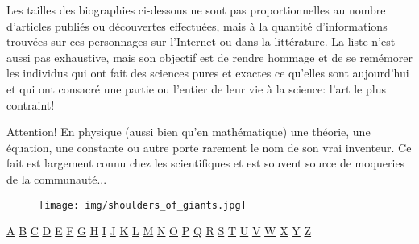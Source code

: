 Les tailles des biographies ci-dessous ne sont pas proportionnelles au nombre d'articles publiés ou découvertes effectuées, mais à la quantité d'informations trouvées sur ces personnages sur l'Internet ou dans la littérature. La liste n'est aussi pas exhaustive, mais son objectif est de rendre hommage et de se remémorer les individus qui ont fait des sciences pures et exactes ce qu'elles sont aujourd'hui et qui ont consacré une partie ou l'entier de leur vie à la science: l'art le plus contraint!

Attention! En physique (aussi bien qu'en mathématique) une théorie, une équation, une constante ou autre porte rarement le nom de son vrai inventeur. Ce fait est largement connu chez les scientifiques et est souvent source de moqueries de la communauté...

	\begin{figure}[H]
		\centering
		\texttt{[image: img/shoulders\_of\_giants.jpg]}	
	\end{figure}

\begin{center}
\hyperref[sec:A]{A} \hyperref[sec:B]{B} \hyperref[sec:C]{C} \hyperref[sec:D]{D} \hyperref[sec:E]{E} \hyperref[sec:F]{F} \hyperref[sec:G]{G} \hyperref[sec:H]{H} \hyperref[sec:I]{I} \hyperref[sec:J]{J} \hyperref[sec:K]{K} \hyperref[sec:L]{L} \hyperref[sec:M]{M} \hyperref[sec:N]{N} \hyperref[sec:O]{O} \hyperref[sec:P]{P} \hyperref[sec:Q]{Q} \hyperref[sec:R]{R} \hyperref[sec:S]{S} \hyperref[sec:T]{T} \hyperref[sec:U]{U} \hyperref[sec:V]{V} \hyperref[sec:W]{W} \hyperref[sec:X]{X} \hyperref[sec:Y]{Y} \hyperref[sec:Z]{Z}
\end{center}

{}
\label{sec:A}
		
